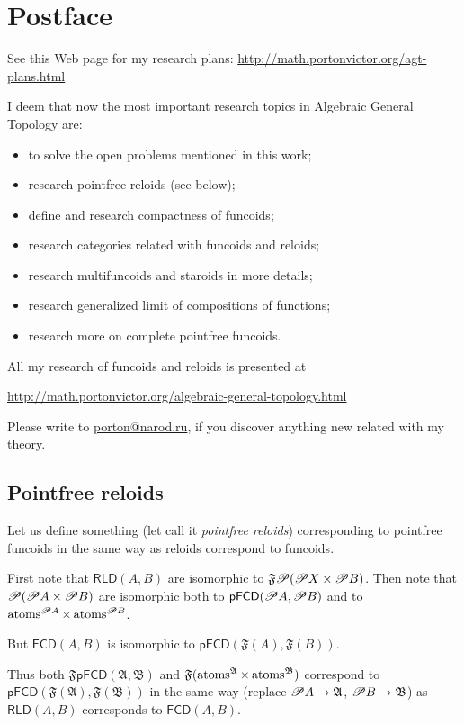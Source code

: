 
\chapter{Postface}

See this Web page for my research plans: \href{http://math.portonvictor.org/agt-plans.html}{http://math.portonvictor.org/agt-plans.html}

I deem that now the most important research topics in Algebraic General
Topology are:
\begin{itemize}
\item to solve the open problems mentioned in this work;
\item research pointfree reloids (see below);
\item define and research compactness of funcoids;
\item research categories related with funcoids and reloids;
\item research multifuncoids and staroids in more details;
\item research generalized limit of compositions of functions;
\item research more on complete pointfree funcoids.
\end{itemize}
All my research of funcoids and reloids is presented at

\href{http://math.portonvictor.org/algebraic-general-topology.html}{http://math.portonvictor.org/algebraic-general-topology.html}

Please write to \href{mailto:porton@narod.ru}{porton@narod.ru}, if
you discover anything new related with my theory.


\section{Pointfree reloids}

Let us define something (let call it \emph{pointfree reloids}) corresponding
to pointfree funcoids in the same way as reloids correspond to funcoids.

First note that $\mathsf{RLD}(A,B)$ are isomorphic to $\mathfrak{F}\mathscr{P}(\mathscr{P} X\times\mathscr{P} B)$.
Then note that $\mathscr{P}(\mathscr{P} A\times\mathscr{P} B)$ are isomorphic
both to $\mathsf{pFCD}(\mathscr{P} A,\mathscr{P} B)$ and to $\operatorname{atoms}^{\mathscr{P} A}\times\operatorname{atoms}^{\mathscr{P} B}$.

But $\mathsf{FCD}(A,B)$ is isomorphic to $\mathsf{pFCD}(\mathfrak{F}(A),\mathfrak{F}(B))$.

Thus both $\mathfrak{F}\mathsf{pFCD}(\mathfrak{A},\mathfrak{B})$
and $\mathfrak{F}(\operatorname{atoms}^{\mathfrak{A}}\times\operatorname{atoms}^{\mathfrak{B}})$
correspond to $\mathsf{pFCD}(\mathfrak{F}(\mathfrak{A}),\mathfrak{F}(\mathfrak{B}))$
in the same way (replace $\mathscr{P} A\rightarrow\mathfrak{A}$, $\mathscr{P} B\rightarrow\mathfrak{B}$)
as $\mathsf{RLD}(A,B)$ corresponds to $\mathsf{FCD}(A,B)$.

